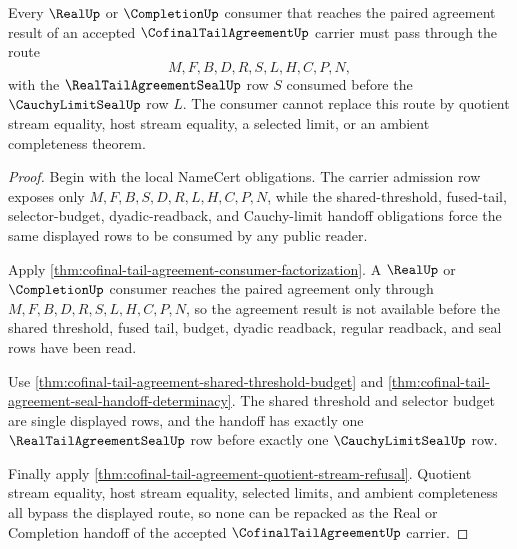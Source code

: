 \begin{theorem}
\label{thm:cofinal-tail-agreement-real-completion-handoff}
Every $\RealUp$ or $\CompletionUp$ consumer that reaches the paired agreement result of an accepted $\CofinalTailAgreementUp$ carrier must pass through the route
$$
M,F,B,D,R,S,L,H,C,P,N,
$$
with the $\RealTailAgreementSealUp$ row $S$ consumed before the $\CauchyLimitSealUp$ row $L$. The consumer cannot replace this route by quotient stream equality, host stream equality, a selected limit, or an ambient completeness theorem.
\end{theorem}
\begin{proof}
Begin with the local NameCert obligations. The carrier admission row exposes only $M,F,B,S,D,R,L,H,C,P,N$, while the shared-threshold, fused-tail, selector-budget, dyadic-readback, and Cauchy-limit handoff obligations force the same displayed rows to be consumed by any public reader.

Apply \autoref{thm:cofinal-tail-agreement-consumer-factorization}. A $\RealUp$ or $\CompletionUp$ consumer reaches the paired agreement only through $M,F,B,D,R,S,L,H,C,P,N$, so the agreement result is not available before the shared threshold, fused tail, budget, dyadic readback, regular readback, and seal rows have been read.

Use \autoref{thm:cofinal-tail-agreement-shared-threshold-budget} and \autoref{thm:cofinal-tail-agreement-seal-handoff-determinacy}. The shared threshold and selector budget are single displayed rows, and the handoff has exactly one $\RealTailAgreementSealUp$ row before exactly one $\CauchyLimitSealUp$ row.

Finally apply \autoref{thm:cofinal-tail-agreement-quotient-stream-refusal}. Quotient stream equality, host stream equality, selected limits, and ambient completeness all bypass the displayed route, so none can be repacked as the Real or Completion handoff of the accepted $\CofinalTailAgreementUp$ carrier.
\end{proof}


